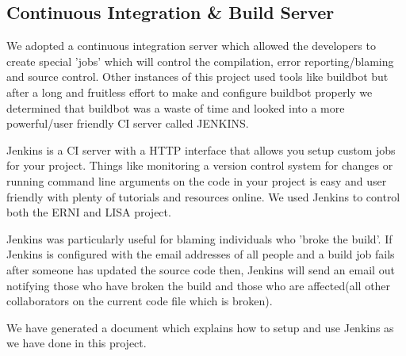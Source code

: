 \subsection{Continuous Integration \& Build Server}

We adopted a continuous integration server which allowed the developers to create special 'jobs' which will control the compilation, error reporting/blaming and source control. Other instances of this project used tools like buildbot but after a long and fruitless effort to make and configure buildbot properly we determined that buildbot was a waste of time and looked into a more powerful/user friendly CI server called JENKINS. 

Jenkins is a CI server with a HTTP interface that allows you setup custom jobs for your project. Things like monitoring a version control system for changes or running command line arguments on the code in your project is easy and user friendly with plenty of tutorials and resources online. We used Jenkins to control both the ERNI and LISA project. 

Jenkins was particularly useful for blaming individuals who 'broke the build'. If Jenkins is configured with the email addresses of all people and a build job fails after someone has updated the source code then, Jenkins will send an email out notifying those who have broken the build and those who are affected(all other collaborators on the current code file which is broken).

We have generated a document which explains how to setup and use Jenkins as we have done in this project. 